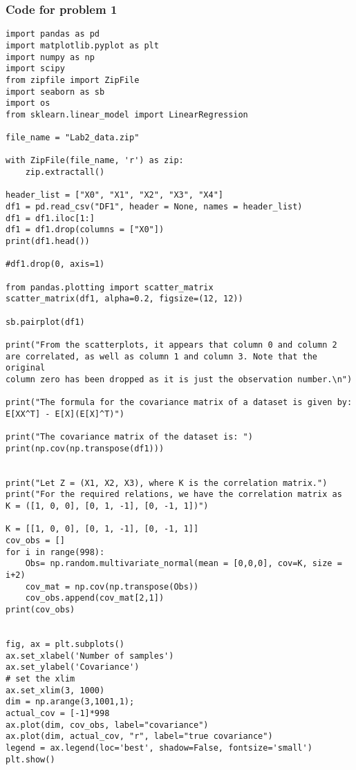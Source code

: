 \documentclass[12pt]{article}%
\begin{document}
\subsubsection{Code for problem 1}
\begin{lstlisting}
import pandas as pd
import matplotlib.pyplot as plt
import numpy as np
import scipy
from zipfile import ZipFile 
import seaborn as sb
import os
from sklearn.linear_model import LinearRegression

file_name = "Lab2_data.zip"

with ZipFile(file_name, 'r') as zip: 
    zip.extractall() 

header_list = ["X0", "X1", "X2", "X3", "X4"]
df1 = pd.read_csv("DF1", header = None, names = header_list)
df1 = df1.iloc[1:]
df1 = df1.drop(columns = ["X0"])
print(df1.head())

#df1.drop(0, axis=1)

from pandas.plotting import scatter_matrix
scatter_matrix(df1, alpha=0.2, figsize=(12, 12))

sb.pairplot(df1)

print("From the scatterplots, it appears that column 0 and column 2 
are correlated, as well as column 1 and column 3. Note that the original
column zero has been dropped as it is just the observation number.\n")

print("The formula for the covariance matrix of a dataset is given by:
E[XX^T] - E[X](E[X]^T)")

print("The covariance matrix of the dataset is: ")
print(np.cov(np.transpose(df1)))


print("Let Z = (X1, X2, X3), where K is the correlation matrix.")
print("For the required relations, we have the correlation matrix as
K = ([1, 0, 0], [0, 1, -1], [0, -1, 1])")

K = [[1, 0, 0], [0, 1, -1], [0, -1, 1]]
cov_obs = []
for i in range(998):
    Obs= np.random.multivariate_normal(mean = [0,0,0], cov=K, size = i+2)
    cov_mat = np.cov(np.transpose(Obs))
    cov_obs.append(cov_mat[2,1])
print(cov_obs)


fig, ax = plt.subplots()
ax.set_xlabel('Number of samples') 
ax.set_ylabel('Covariance')
# set the xlim
ax.set_xlim(3, 1000)
dim = np.arange(3,1001,1);
actual_cov = [-1]*998
ax.plot(dim, cov_obs, label="covariance") 
ax.plot(dim, actual_cov, "r", label="true covariance") 
legend = ax.legend(loc='best', shadow=False, fontsize='small')
plt.show()
\end{lstlisting}

\end{document}
